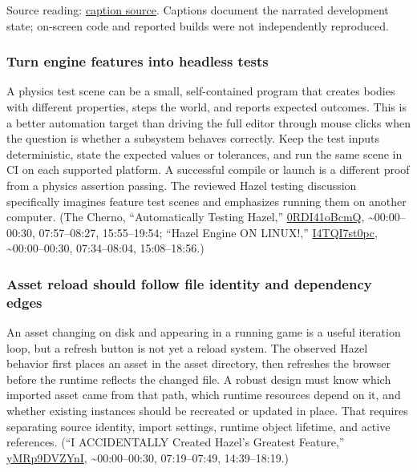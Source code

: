 Source reading: \href{https://www.youtube.com/watch?v=3ZFcvBjRFN0}{caption source}. Captions document the narrated development state; on-screen code and reported builds were not independently reproduced.

\subsubsection{Turn engine features into headless tests}\label{turn-engine-features-into-headless-tests}

A physics test scene can be a small, self-contained program that creates bodies with different properties, steps the world, and reports expected outcomes. This is a better automation target than driving the full editor through mouse clicks when the question is whether a subsystem behaves correctly. Keep the test inputs deterministic, state the expected values or tolerances, and run the same scene in CI on each supported platform. A successful compile or launch is a different proof from a physics assertion passing. The reviewed Hazel testing discussion specifically imagines feature test scenes and emphasizes running them on another computer. (The Cherno, ``Automatically Testing Hazel,'' \href{https://www.youtube.com/watch?v=0RDI41oBcmQ}{0RDI41oBcmQ}, \textasciitilde00:00--00:30, 07:57--08:27, 15:55--19:54; ``Hazel Engine ON LINUX!,'' \href{https://www.youtube.com/watch?v=I4TQI7st0pc}{I4TQI7st0pc}, \textasciitilde00:00--00:30, 07:34--08:04, 15:08--18:56.)

\subsubsection{Asset reload should follow file identity and dependency edges}\label{asset-reload-should-follow-file-identity-and-dependency-edges}

An asset changing on disk and appearing in a running game is a useful iteration loop, but a refresh button is not yet a reload system. The observed Hazel behavior first places an asset in the asset directory, then refreshes the browser before the runtime reflects the changed file. A robust design must know which imported asset came from that path, which runtime resources depend on it, and whether existing instances should be recreated or updated in place. That requires separating source identity, import settings, runtime object lifetime, and active references. (``I ACCIDENTALLY Created Hazel's Greatest Feature,'' \href{https://www.youtube.com/watch?v=yMRp9DVZYnI}{yMRp9DVZYnI}, \textasciitilde00:00--00:30, 07:19--07:49, 14:39--18:19.)

